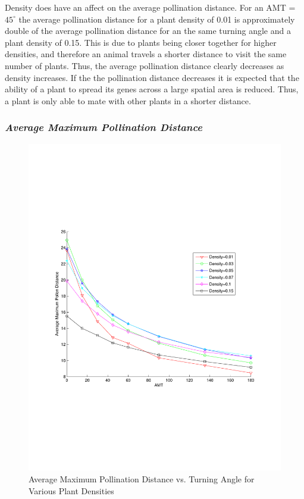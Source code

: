 \documentclass[preprint,12pt]{elsarticle}
\numberwithin{equation}{subsection}
\begin{document}
Density does have an affect on the average pollination distance. For an AMT =
$45^\circ$ the average pollination distance for a plant density of 0.01 is
approximately double of the average pollination distance for an the same turning
angle and a plant density of 0.15. This is due to plants being closer together
for higher densities, and therefore an animal travels a shorter distance to
visit the same number of plants. Thus, the average pollination distance clearly
decreases as density increases. If the the pollination distance decreases it is
expected that the ability of a plant to spread its genes across a large spatial
area is reduced. Thus, a plant is only able to mate with other plants in a
shorter distance.

\subsubsection*{\emph{Average Maximum Pollination Distance}}
\begin{figure}
  \begin{center}
  \includegraphics[width=1.0\textwidth]{MaxPollenVsAMT.pdf}
  \end{center}
  \caption{\small Average Maximum Pollination Distance vs. Turning Angle for
Various Plant Densities}
  \label{AvgMaxDTreesN}
\end{figure}
\end{document}
